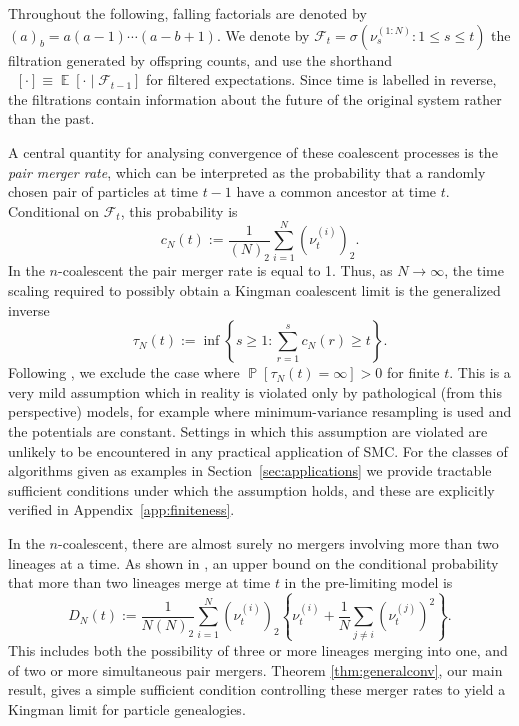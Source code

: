 \documentclass{article} %
\theoremstyle{definition}
\DeclareMathOperator{\Prob}{\mathbb{P}}
\DeclareMathOperator{\E}{\mathbb{E}}
\DeclareMathOperator{\Et}{\mathbb{E}_t}
\newcommand{\1}[1]{\mathbbm{1}_{\{#1\}}}
\begin{document}
Throughout the following, falling factorials are denoted by $(a)_b = a(a-1) \cdots (a-b+1)$. We denote by $\mathcal{F}_{t} = \sigma(\nu_s^{(1:N)} : 1 \leq s \leq t)$ the filtration generated by offspring counts, and use the shorthand $\Et[\cdot] \equiv \E[ \cdot \mid \mathcal{F}_{t-1} ]$ for filtered expectations. Since time is labelled in reverse, the filtrations contain information about the future of the original system rather than the past.

A central quantity for analysing convergence of these coalescent processes is the \emph{pair merger rate}, which can be interpreted as the probability that a randomly chosen pair of particles at time $t-1$ have a common ancestor at time $t$. Conditional on $\mathcal{F}_t$, this probability is
\begin{equation}\label{eq:coalescence_rate}
c_N(t) := \frac{1}{(N)_2}\sum_{i=1}^N (\nu_t^{(i)})_2 .
\end{equation}
In the $n$-coalescent the pair merger rate is equal to 1. 
Thus, as $N\to\infty$, the time scaling required to possibly obtain a Kingman coalescent limit is the generalized inverse
\begin{equation*}
\tau_N(t) := \inf \left\{ s\geq 1 : \sum_{r=1}^s c_N(r) \geq t \right\} .
\end{equation*}
Following \cite{mohle1998}, we exclude the case where $\Prob[ \tau_N(t) = \infty ] >0$ for finite $t$. 
This is a very mild assumption which in reality is violated only by pathological (from this perspective) models, for example where minimum-variance resampling is used and the potentials are constant. Settings in which this assumption are violated are unlikely to be encountered in any practical application of SMC. For the classes of algorithms given as examples in Section~\ref{sec:applications} we provide tractable sufficient conditions under which the assumption holds, and these are explicitly verified in Appendix~\ref{app:finiteness}.

In the $n$-coalescent, there are almost surely no mergers involving more than two lineages at a time. 
As shown in \cite[Lemma 1, Case 3]{koskela2018}, an upper bound on the conditional probability that more than two lineages merge at time $t$ in the pre-limiting model is
\begin{equation*}
D_N(t) := \frac{1}{N(N)_2} \sum_{i=1}^N (\nu_t^{(i)})_2 \left\{\nu_t^{(i)} + \frac{1}{N} \sum_{j\neq i} (\nu_t^{(j)})^2 \right\} .
\end{equation*}
This includes both the possibility of three or more lineages merging into one, and of two or more simultaneous pair mergers.
Theorem \ref{thm:generalconv}, our main result, gives a simple sufficient condition controlling these merger rates to yield a Kingman limit for particle genealogies.
\end{document}
